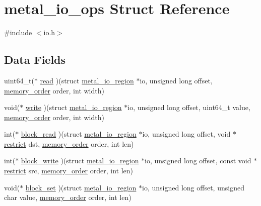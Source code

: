 \hypertarget{structmetal__io__ops}{}\section{metal\+\_\+io\+\_\+ops Struct Reference}
\label{structmetal__io__ops}


{\ttfamily \#include $<$io.\+h$>$}

\subsection*{Data Fields}
\begin{DoxyCompactItemize}
\item 
uint64\+\_\+t($\ast$ \hyperlink{structmetal__io__ops_a3cba7140674cb2eeb9fc74ad614ea9fb}{read} )(struct \hyperlink{structmetal__io__region}{metal\+\_\+io\+\_\+region} $\ast$io, unsigned long offset, \hyperlink{compiler_2gcc_2atomic_8h_a17c2de5ae768960284c047a320f17d1b}{memory\+\_\+order} order, int width)
\item 
void($\ast$ \hyperlink{structmetal__io__ops_a322ff06f9ee06132d4008d2578b2ef68}{write} )(struct \hyperlink{structmetal__io__region}{metal\+\_\+io\+\_\+region} $\ast$io, unsigned long offset, uint64\+\_\+t value, \hyperlink{compiler_2gcc_2atomic_8h_a17c2de5ae768960284c047a320f17d1b}{memory\+\_\+order} order, int width)
\item 
int($\ast$ \hyperlink{structmetal__io__ops_aef9e6cebfe3c55299f18763b10ca463e}{block\+\_\+read} )(struct \hyperlink{structmetal__io__region}{metal\+\_\+io\+\_\+region} $\ast$io, unsigned long offset, void $\ast$\hyperlink{compiler_2iar_2compiler_8h_a080abdcb9c02438f1cd2bb707af25af8}{restrict} dst, \hyperlink{compiler_2gcc_2atomic_8h_a17c2de5ae768960284c047a320f17d1b}{memory\+\_\+order} order, int len)
\item 
int($\ast$ \hyperlink{structmetal__io__ops_aa935d3f9b5c10d0e674dd86c19dfb21c}{block\+\_\+write} )(struct \hyperlink{structmetal__io__region}{metal\+\_\+io\+\_\+region} $\ast$io, unsigned long offset, const void $\ast$\hyperlink{compiler_2iar_2compiler_8h_a080abdcb9c02438f1cd2bb707af25af8}{restrict} src, \hyperlink{compiler_2gcc_2atomic_8h_a17c2de5ae768960284c047a320f17d1b}{memory\+\_\+order} order, int len)
\item 
void($\ast$ \hyperlink{structmetal__io__ops_af70cb8c3927ddf353c0c36503e033a98}{block\+\_\+set} )(struct \hyperlink{structmetal__io__region}{metal\+\_\+io\+\_\+region} $\ast$io, unsigned long offset, unsigned char value, \hyperlink{compiler_2gcc_2atomic_8h_a17c2de5ae768960284c047a320f17d1b}{memory\+\_\+order} order, int len)

\end{DoxyCompactItemize}
